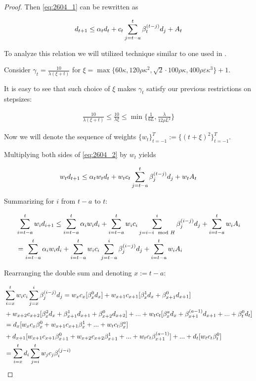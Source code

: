 \begin{proof}
Then \eqref{eq:2604_1} can be rewritten as

\begin{align}
    d_{t+1} \leq \alpha_t d_t + c_t \summ{j=t-a}{t} \beta_{t}^{(t-j)} d_j  + A_t \label{eq:2604_2}
\end{align}

To analyze this relation we will utilized technique similar to one used in \cite{Spiridonoff}.

Consider $\gamma_t = \frac{10}{\lambda(\xi + t)}$ for $\xi = \max \{ 60\kappa, 120\rho\kappa^2,  \sqrt{2}\cdot 100 \rho \kappa, 400 \rho \varepsilon \kappa^3\} + 1$.

It is easy to see that such choice of $\xi$ makes $\gamma_t$ satisfy our previous restrictions on stepsizes:

\begin{align}
    \frac{10}{\lambda(\xi + t)} \leq \frac{10}{\lambda \xi} \leq \min \{ \frac{1}{6L}, \frac{\lambda}{12\rho L^2} \}
\end{align}

Now we will denote the sequence of weights $\{w_t\}_{t=-1}^T := \{(t + \xi)^2\}_{t=-1}^T$. 

Multiplying both sides of \eqref{eq:2604_2} by $w_t$ yields

\begin{align}
    w_t d_{t+1} \leq \alpha_t w_t d_t + w_t c_t \summ{j=t-a}{t} \beta_{j}^{(t-j)} d_j  + w_t A_t \label{2604_2}
\end{align}

Summarizing for $i$ from $t-a$ to $t$:

\begin{align}
    &\summ{i = t-a}{t} w_i d_{i+1} \leq \summ{i = t-a}{t} \alpha_i w_i d_i
    + \summ{i=t-a}{t} w_i c_i \summ{j=i- i \mod H}{i} \beta_{j}^{(i-j)} d_j + \summ{i=t-a}{t} w_i A_i \\
    &=
    \summ{i = t-a}{t} \alpha_i w_i d_i
    + \summ{i=t-a}{t} w_i c_i \summ{j=t-a}{i} \beta_{j}^{(i-j)} d_j + \summ{i=t-a}{t} w_i A_i \label{eq:2604_3}
\end{align}

Rearranging the double sum and denoting $x := t - a$:

\begin{align}
    &\summ{i=x}{t} w_i c_i \summ{j=x}{i} \beta_{j}^{(i-j)} d_j 
    = w_{x}c_{x} [ \beta_{x}^{0}d_x ] 
    + w_{x+1}c_{x+1} [\beta_{x}^1 d_x + \beta_{x+1}^0 d_{x+1}] \\
    &+ w_{x+2}c_{x+2} [\beta_{x}^2 d_x + \beta_{x+1}^1 d_{x+1} + \beta_{x+2}^0 d_{x+2}] + ... + w_t c_t [\beta_{x}^a d_x + \beta_{x+1}^{(a-1)} d_{x+1} + ... + \beta_{t}^0 d_t] \\
    &= d_x [w_x c_x \beta_{x}^0 + w_{x+1} c_{x+1} \beta_{x}^1 + ... + w_t c_t \beta_{x}^a]
    \\
    &+ d_{x+1} [w_{x+1} c_{x+1} \beta_{x+1}^0 + w_{x+2} c_{x+2} \beta_{x+1}^1 + ... + w_t c_t \beta_{x+1}^{(a-1)}] + ... + d_t [w_t c_t \beta_{t}^0] \\
    &=\summ{i=x}{t} d_i \summ{j=i}{t} w_j c_j \beta_{i}^{(j-i)} \label{eq:2604_4}
\end{align}


\end{proof}

